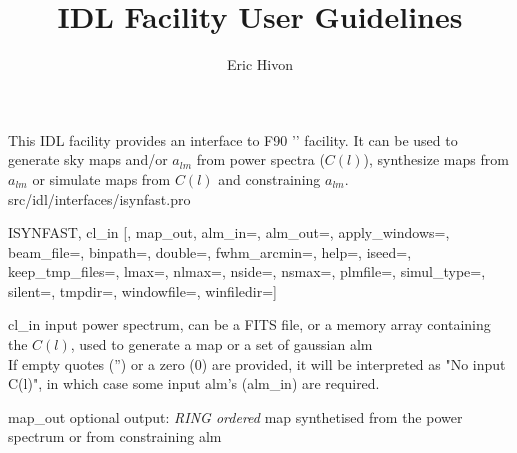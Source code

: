 
\sloppy

\title{\healpix IDL Facility User Guidelines}
 \section[isynfast]{ }
\label{idl:isynfast}
\author{Eric Hivon}

\begin{facility}
{This IDL facility provides an interface to F90 '' facility. It can be
used to generate sky maps and/or $a_{lm}$ from power spectra ($C(l)$), synthesize maps from
$a_{lm}$ or simulate maps from $C(l)$ and constraining $a_{lm}$.}
{src/idl/interfaces/isynfast.pro}
\end{facility}

\begin{IDLformat}
{ISYNFAST, cl\_in [, map\_out,
      alm\_in=,  alm\_out=, apply\_windows=, beam\_file=, binpath=, double=, fwhm\_arcmin=, help=,
      iseed=, keep\_tmp\_files=, lmax=, nlmax=, nside=, nsmax=, plmfile=,
      simul\_type=, silent=, tmpdir=, windowfile=, winfiledir=]}
\end{IDLformat}

\begin{qualifiers}
  \begin{qulist}{} %
   \item[cl\_in] input power spectrum, can be a FITS file, or a memory array containing the
        $C(l)$, used to generate a map or a set of gaussian alm \\
   If empty quotes ('') or a zero (0) are provided, it will be interpreted as "No input C(l)", in
   which case some input alm's (alm\_in) are required.
    \item[map\_out] optional output: {\em RING ordered} map synthetised from the power spectrum or from constraining alm
  \end{qulist}
\end{qualifiers}

